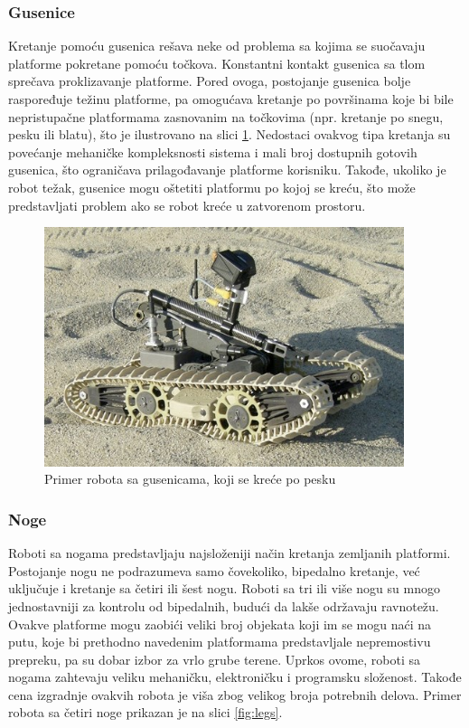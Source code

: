 \documentclass[12pt,a4paper]{report}
\begin{document}
\subsubsection{Gusenice}

Kretanje pomoću gusenica rešava neke od problema sa kojima se suočavaju platforme pokretane pomoću točkova. Konstantni kontakt gusenica sa tlom sprečava proklizavanje platforme. Pored ovoga, postojanje gusenica bolje raspoređuje težinu platforme, pa omogućava kretanje po površinama koje bi bile nepristupačne platformama zasnovanim na točkovima (npr. kretanje po snegu, pesku ili blatu), što je ilustrovano na slici \ref{fig:tracks}. Nedostaci ovakvog tipa kretanja su povećanje mehaničke kompleksnosti sistema i mali broj dostupnih gotovih gusenica, što ograničava prilagođavanje platforme korisniku. Takođe, ukoliko je robot težak, gusenice mogu oštetiti platformu po kojoj se kreću, što može predstavljati problem ako se robot kreće u zatvorenom prostoru.

\begin{figure}[H]
    \centering
    \includegraphics[height=7cm, keepaspectratio]{img/tracks.jpg}    
    \caption{Primer robota sa gusenicama, koji se kreće po pesku}
    \label{fig:tracks}
\end{figure}

\subsubsection{Noge}

Roboti sa nogama predstavljaju najsloženiji način kretanja zemljanih platformi. Postojanje nogu ne podrazumeva samo čovekoliko, bipedalno kretanje, već uključuje i kretanje sa četiri ili šest nogu. Roboti sa tri ili više nogu su mnogo jednostavniji za kontrolu od bipedalnih, budući da lakše održavaju ravnotežu. Ovakve platforme mogu zaobići veliki broj objekata koji im se mogu naći na putu, koje bi prethodno navedenim platformama predstavljale nepremostivu prepreku, pa su dobar izbor za vrlo grube terene. Uprkos ovome, roboti sa nogama zahtevaju veliku mehaničku, elektroničku i programsku složenost. Takođe cena izgradnje ovakvih robota je viša zbog velikog broja potrebnih delova. Primer robota sa četiri noge prikazan je na slici \ref{fig:legs}.
\end{document}
